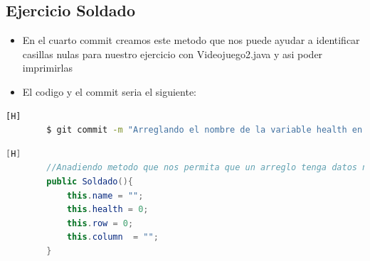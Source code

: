 \documentclass{article}
\begin{document}
	\subsection{Ejercicio Soldado}
	\begin{itemize}	
		\item En el cuarto commit creamos este metodo que nos puede ayudar a identificar casillas nulas para nuestro ejercicio con Videojuego2.java y asi poder imprimirlas 
		\item El codigo y el commit seria el siguiente:
	\end{itemize}	
	\begin{lstlisting}[language=bash,caption={Commit}][H]
		$ git commit -m "Arreglando el nombre de la variable health en la clase soldado "
	\end{lstlisting}	
	\begin{lstlisting}[language=java,caption={Las lineas de codigos del metodo creado:}][H]
		//Anadiendo metodo que nos permita que un arreglo tenga datos nulos si este esta vacio
		public Soldado(){
			this.name = "";
			this.health = 0;
			this.row = 0;
			this.column  = "";
		}
	\end{lstlisting}
\end{document}
